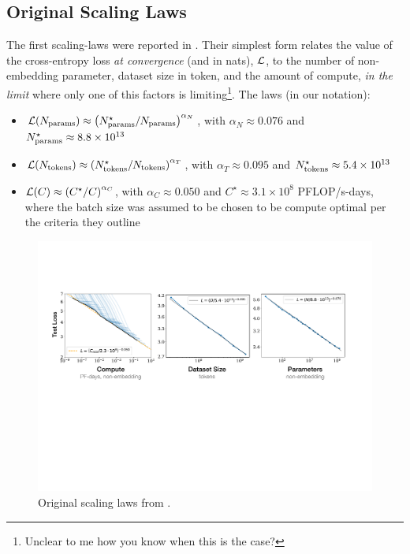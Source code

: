 \documentclass[11pt]{article}
\begin{document}
\subsection{Original Scaling Laws}


The first scaling-laws were reported in \cite{kaplan2020scaling}.   Their simplest form relates the
value of the cross-entropy loss \textit{at convergence} (and in nats), $ \mathcal{L}  $,  to the number of non-embedding
parameter, dataset size in token, and the amount of compute, \textit{in the limit} where only one of
this factors is limiting\footnote{Unclear to me how you know when this is the case?}. The laws (in our notation):
\begin{itemize}
    \item $ \mathcal{L} (N _{ {\rm params} }) \approx  \left ( N _{ {\rm  params} }^{ \star } / N _{ {\rm  params}
        } \right ) ^{ \alpha _{ N } } $, with $ \alpha _{ N } \approx 0.076 $ and $ N _{ {\rm params} } ^{ \star }  \approx
        8.8\times 10 ^{ 13 }$
    \item $ \mathcal{L} (N _{ {\rm  tokens} }) \approx  \left ( N _{ {\rm tokens}} ^{ \star } / N _{ {\rm  tokens}
        } \right ) ^{ \alpha _{ T } } $, with $ \alpha _{ T } \approx 0.095 $ and $ N _{{\rm  tokens}  } ^{  \star }  \approx
        5.4\times 10 ^{ 13 }$
    \item $ \mathcal{L} (C) \approx  \left ( C ^{ \star } /  C
         \right ) ^{ \alpha _{ C } } $, with $ \alpha _{ C } \approx 0.050  $ and $ C ^{  \star }  \approx
        3.1\times 10 ^{8} $ PFLOP/s-days, where the batch size was assumed to be chosen to be compute optimal per the criteria they outline
\end{itemize}

\begin{figure}[ht]
    \centering
    \includegraphics[scale=.5]{figures/SimplePowerLaws.pdf}
    \caption{Original scaling laws from \cite{kaplan2020scaling}.}
    \label{fig_scaling_laws_original_1}
\end{figure}
\end{document}
